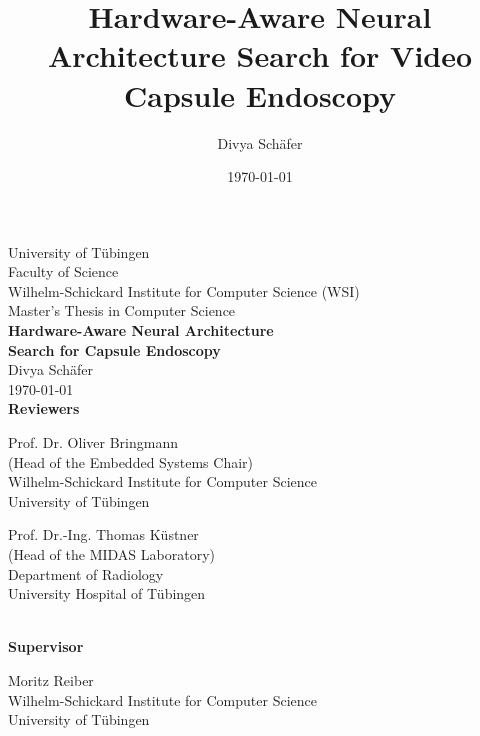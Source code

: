 \documentclass[11pt,a4paper, open=any]{scrbook}
\title{Hardware-Aware Neural Architecture Search for Video Capsule Endoscopy}
\author{Divya Schäfer}
\date{\today}
\begin{document}
	

\begin{titlepage}
	\begin{center}
		
		{\LARGE University of T\"ubingen}\\[0.3cm]
		{\large Faculty of Science}\\
		{\large Wilhelm-Schickard Institute for Computer Science (WSI)}\\[3.5cm]
		
		{\huge Master's Thesis in Computer Science}\\[1.8cm]
		
		{\Huge\bfseries Hardware-Aware Neural Architecture\\[0.35em] Search for Capsule Endoscopy}\\[1.5cm]
		
		{\Large Divya Schäfer}\\[0.5cm]
		
		{\large \today}\\[2cm]
		
		{\small\bfseries Reviewers}\\[0.3cm]
		
		\parbox{7cm}{
			\begin{center}
				{\large Prof. Dr. Oliver Bringmann}\\
				(Head of the Embedded Systems Chair)\\[0.5em]
				{\footnotesize
					Wilhelm-Schickard Institute for Computer Science\\
					University of T\"ubingen}
		\end{center}}
		\hfill
		\parbox{7cm}{
			\begin{center}
				{\large Prof. Dr.-Ing. Thomas Küstner}\\
				(Head of the MIDAS Laboratory)\\[0.5em]
				{\footnotesize
					Department of Radiology\\
					University Hospital of T\"ubingen}
			\end{center}
		}\\[1.2cm]
		
		{\small\bfseries Supervisor}\\[0.1cm]
		
		\parbox{14cm}{
			\begin{center}
			Moritz Reiber\\[0.5em]
				{\footnotesize
					Wilhelm-Schickard Institute for Computer Science\\
					University of T\"ubingen}
		\end{center}}
		
	\end{center}
	
\vfill


\end{titlepage}
\end{document}
